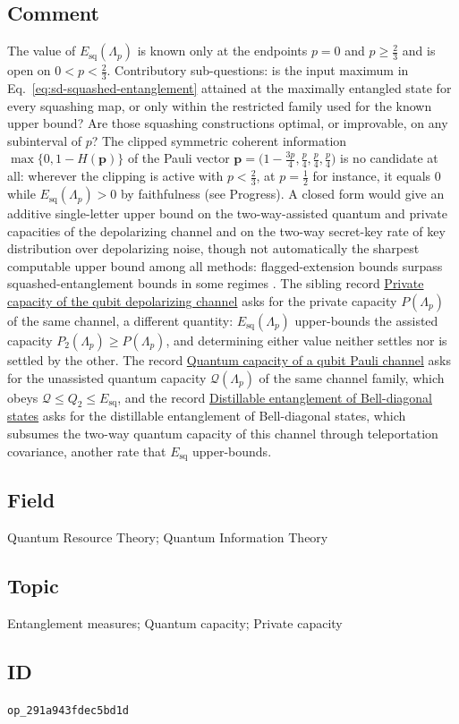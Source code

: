 \subsection*{Comment}

The value of $E_{\mathrm{sq}}(\Lambda_p)$ is known only at the endpoints
$p=0$ and $p\ge\tfrac{2}{3}$ and is open on $0<p<\tfrac{2}{3}$.  Contributory
sub-questions: is the input maximum in
Eq.~\eqref{eq:sd-squashed-entanglement} attained at the maximally entangled
state for every squashing map, or only within the restricted family used for
the known upper bound?  Are those squashing constructions optimal, or
improvable, on any subinterval of $p$?  The clipped symmetric coherent
information $\max\{0,1-H(\mathbf p)\}$ of the Pauli vector
$\mathbf p=\bigl(1-\tfrac{3p}{4},\tfrac{p}{4},\tfrac{p}{4},\tfrac{p}{4}\bigr)$
is no candidate at all: wherever the clipping is active with
$p<\tfrac{2}{3}$, at $p=\tfrac{1}{2}$ for instance, it equals $0$ while
$E_{\mathrm{sq}}(\Lambda_p)>0$ by faithfulness (see Progress).  A closed form
would give an additive single-letter upper bound on the two-way-assisted
quantum and private capacities of the depolarizing channel and on the
two-way secret-key rate of key distribution over depolarizing noise, though
not automatically the sharpest computable upper bound among all methods:
flagged-extension bounds surpass squashed-entanglement bounds in some
regimes .  The sibling record
\href{https://qiqc-op.com/problem/op_d2813fe3fcdf09ad/}{Private capacity of the qubit depolarizing channel} asks for the private capacity
$P(\Lambda_p)$ of the same channel, a different quantity:
$E_{\mathrm{sq}}(\Lambda_p)$ upper-bounds the assisted capacity
$P_2(\Lambda_p)\ge P(\Lambda_p)$, and determining either value neither
settles nor is settled by the other.  The record
\href{https://qiqc-op.com/problem/op_43d4aca67bd52554/}{Quantum capacity of a qubit Pauli channel} asks for the unassisted quantum capacity
$\mathcal Q(\Lambda_p)$ of the same channel family, which obeys
$\mathcal Q\le Q_2\le E_{\mathrm{sq}}$, and the record
\href{https://qiqc-op.com/problem/op_b93eb7197c926d9e/}{Distillable entanglement of Bell-diagonal states} asks for the distillable entanglement of
Bell-diagonal states, which subsumes the two-way quantum capacity of this
channel through teleportation covariance, another rate that
$E_{\mathrm{sq}}$ upper-bounds.

\subsection*{Field}

Quantum Resource Theory; Quantum Information Theory

\subsection*{Topic}

Entanglement measures; Quantum capacity; Private capacity

\subsection*{ID}

\texttt{op\_291a943fdec5bd1d}
